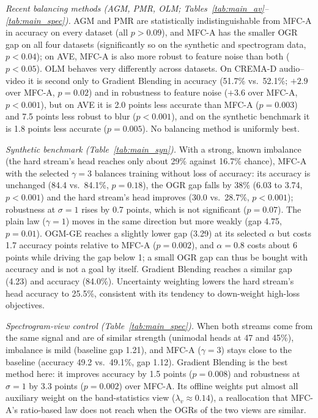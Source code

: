 \documentclass[fleqn,10pt]{wlscirep}
\begin{document}
\emph{Recent balancing methods (AGM, PMR, OLM; Tables~\ref{tab:main_av}--\ref{tab:main_spec}).} AGM and PMR are statistically indistinguishable from MFC-A in accuracy on every dataset (all $p>0.09$), and MFC-A has the smaller OGR gap on all four datasets (significantly so on the synthetic and spectrogram data, $p<0.04$); on AVE, MFC-A is also more robust to feature noise than both ($p<0.05$). OLM behaves very differently across datasets. On CREMA-D audio--video it is second only to Gradient Blending in accuracy (51.7\% vs.\ 52.1\%; $+2.9$ over MFC-A, $p{=}0.02$) and in robustness to feature noise ($+3.6$ over MFC-A, $p<0.001$), but on AVE it is 2.0 points less accurate than MFC-A ($p{=}0.003$) and 7.5 points less robust to blur ($p<0.001$), and on the synthetic benchmark it is 1.8 points less accurate ($p{=}0.005$). No balancing method is uniformly best.

\emph{Synthetic benchmark (Table~\ref{tab:main_syn}).} With a strong, known imbalance (the hard stream's head reaches only about 29\% against 16.7\% chance), MFC-A with the selected $\gamma{=}3$ balances training without loss of accuracy: its accuracy is unchanged (84.4 vs.\ 84.1\%, $p{=}0.18$), the OGR gap falls by 38\% (6.03 to 3.74, $p<0.001$) and the hard stream's head improves (30.0 vs.\ 28.7\%, $p<0.001$); robustness at $\sigma{=}1$ rises by 0.7 points, which is not significant ($p{=}0.07$). The plain law ($\gamma{=}1$) moves in the same direction but more weakly (gap 4.75, $p{=}0.01$). OGM-GE reaches a slightly lower gap (3.29) at its selected $\alpha$ but costs 1.7 accuracy points relative to MFC-A ($p{=}0.002$), and $\alpha{=}0.8$ costs about 6 points while driving the gap below 1; a small OGR gap can thus be bought with accuracy and is not a goal by itself. Gradient Blending reaches a similar gap (4.23) and accuracy (84.0\%). Uncertainty weighting lowers the hard stream's head accuracy to 25.5\%, consistent with its tendency to down-weight high-loss objectives.

\emph{Spectrogram-view control (Table~\ref{tab:main_spec}).} When both streams come from the same signal and are of similar strength (unimodal heads at 47 and 45\%), imbalance is mild (baseline gap 1.21), and MFC-A ($\gamma{=}3$) stays close to the baseline (accuracy 49.2 vs.\ 49.1\%, gap 1.12). Gradient Blending is the best method here: it improves accuracy by 1.5 points ($p{=}0.008$) and robustness at $\sigma{=}1$ by 3.3 points ($p{=}0.002$) over MFC-A. Its offline weights put almost all auxiliary weight on the band-statistics view ($\lambda_v\approx0.14$), a reallocation that MFC-A's ratio-based law does not reach when the OGRs of the two views are similar.
\end{document}
